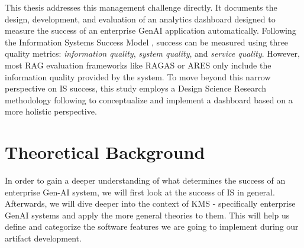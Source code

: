 \documentclass[
	english,
	ruledheaders=section,%
	class=report,%
	thesis={type=bachelor},%
	accentcolor=1b,%
	custommargins=true,%
	marginpar=false,%
	parskip=half-,%
	fontsize=11pt,%
	DIV=14,
]{tudapub}
\begin{document}
This thesis addresses this management challenge directly. It documents the design, development, and evaluation of an analytics dashboard designed to measure the success of an enterprise GenAI application automatically. Following the Information Systems Success Model \parencite{DeloneMcLean2003ISSuccessTenYearUpdate}, success can be measured using three quality metrics: \textit{information quality}, \textit{system quality}, and \textit{service quality}. However, most RAG evaluation frameworks like RAGAS \parencite{Es_James_Espinosa_Anke_Schockaert_2024} or ARES \parencite{Saad_Falcon_Khattab_Potts_Zaharia_2024} only include the information quality provided by the system. To move beyond this narrow perspective on IS success, this study employs a Design Science Research methodology following \cite{Peffers01122007} to conceptualize and implement a dashboard based on a more holistic perspective.
\chapter{Theoretical Background}
In order to gain a deeper understanding of what determines the success of an enterprise Gen-AI system, we will first look at the success of IS in general. Afterwards, we will dive deeper into the context of KMS - specifically enterprise GenAI systems and apply the more general theories to them. This will help us define and categorize the software features we are going to implement during our artifact development.
\end{document}
